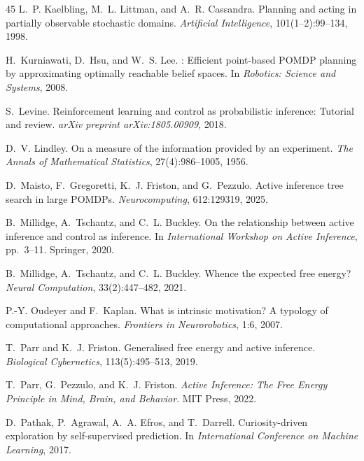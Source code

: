 \documentclass[runningheads]{llncs}
\begin{document}
\begin{thebibliography}{45}
L.~P. Kaelbling, M.~L. Littman, and A.~R. Cassandra.
\newblock Planning and acting in partially observable stochastic domains.
\newblock \emph{Artificial Intelligence}, 101(1--2):99--134, 1998.

H.~Kurniawati, D.~Hsu, and W.~S. Lee.
: Efficient point-based {POMDP} planning by approximating optimally reachable belief spaces.
\newblock In \emph{Robotics: Science and Systems}, 2008.

S.~Levine.
\newblock Reinforcement learning and control as probabilistic inference: Tutorial and review.
\newblock \emph{arXiv preprint arXiv:1805.00909}, 2018.

D.~V. Lindley.
\newblock On a measure of the information provided by an experiment.
\newblock \emph{The Annals of Mathematical Statistics}, 27(4):986--1005, 1956.

D.~Maisto, F.~Gregoretti, K.~J. Friston, and G.~Pezzulo.
\newblock Active inference tree search in large {POMDP}s.
\newblock \emph{Neurocomputing}, 612:129319, 2025.

B.~Millidge, A.~Tschantz, and C.~L. Buckley.
\newblock On the relationship between active inference and control as inference.
\newblock In \emph{International Workshop on Active Inference}, pp.\ 3--11. Springer, 2020.

B.~Millidge, A.~Tschantz, and C.~L. Buckley.
\newblock Whence the expected free energy?
\newblock \emph{Neural Computation}, 33(2):447--482, 2021.

P.-Y. Oudeyer and F.~Kaplan.
\newblock What is intrinsic motivation? {A} typology of computational approaches.
\newblock \emph{Frontiers in Neurorobotics}, 1:6, 2007.

T.~Parr and K.~J. Friston.
\newblock Generalised free energy and active inference.
\newblock \emph{Biological Cybernetics}, 113(5):495--513, 2019.

T.~Parr, G.~Pezzulo, and K.~J. Friston.
\newblock \emph{Active Inference: The Free Energy Principle in Mind, Brain, and Behavior}.
\newblock MIT Press, 2022.

D.~Pathak, P.~Agrawal, A.~A. Efros, and T.~Darrell.
\newblock Curiosity-driven exploration by self-supervised prediction.
\newblock In \emph{International Conference on Machine Learning}, 2017.


\end{thebibliography}
\end{document}
